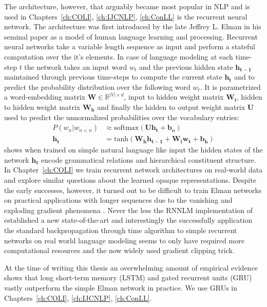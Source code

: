The architecture, however, that arguably became most popular in NLP and is used in
Chapters~\ref{ch:COLI}, \ref{ch:IJCNLP}, \ref{ch:ConLL} is the recurrent neural network. The architecture was
first introduced by the late Jeffrey L. Elman in his seminal paper \citep{elman1990finding}
as a model of human language learning and processing. Recurrent neural networks
take a variable length sequence as input and perform a stateful computation over the it's elements.
In case of language modeling at each time-step $t$ the network takes an input word $w_t$
and the previous hidden state $\mathbf{h_{t-1}}$ maintained through previous time-steps to compute the current
state $\mathbf{h_t}$ and to predict the probability distribution over the following word $w_t$.
It is parametrized a word-embedding matrix $\mathbf{W} \in \mathbb{R}^{|V| \times d}$, input to hidden weight
matrix $\mathbf{W_i}$, hidden to hidden weight matrix $\mathbf{W_h}$ and finally the hidden to output
weight matrix $\mathbf{U}$ used to predict the unnormalized probabilities over the vocabulary entries:
\begin{align}
P(w_n|w_{n<n}) &\approx \text{softmax}(\mathbf{U} \mathbf{h_t} + \mathbf{b_o}) \\
\mathbf{h_t} &= \text{tanh}(\mathbf{W_h}\mathbf{h_{t-1}} + \mathbf{W_i}\mathbf{w_t} + \mathbf{b_h})
\end{align}
\cite{elman1991distributed} shows when trained on simple natural language like input the
hidden states of the network $\mathbf{h_t}$ encode grammatical relations and hierarchical
constituent structure. In Chapter~\ref{ch:COLI} we train recurrent network architectures
on real-world data and explore similar questions about the learned opaque representations.
Despite the early successes, however, it turned out to be difficult to train
Elman networks on practical applications with longer sequences
due to the vanishing and exploding gradient phenomena \citep{bengio1994learning}.
Never the less the RNNLM implementation of \cite{mikolov2010recurrent}
established a new state-of-the-art and interestingly the successfully
application the standard backpropagation through time algorithm  \citep{williams1995gradient}
to simple recurrent networks on real world language modeling \cite{mikolov2012statistical}
seems to only have required more computational resources and the now widely used gradient clipping trick.

At the time of writing this thesis an overwhelming amount of empirical evidence
shows that long short-term memory (LSTM) \citep{hochreiter1997long,gers1999learning}
and gated recurrent units (GRU) \citep{cho2014learning}
vastly outperform the simple Elman network in practice. We use GRUs in
Chapters~\ref{ch:COLI}, \ref{ch:IJCNLP}, \ref{ch:ConLL}.

